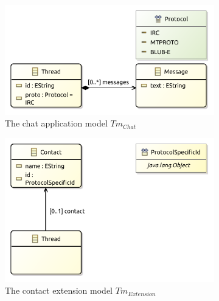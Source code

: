 \begin{figure}
    \centering
    \begin{subfigure}{\textwidth}
        \centering
        \includegraphics{images/04_transformation_framework/type_models_combination/chat_partial2.pdf}
        \caption{The chat application model $Tm_{Chat}$}
        \label{fig:transformation_framework:type_models_and_type_graphs:combining_type_models:combine_example_tmod1}
    \end{subfigure}
    \par\medskip
    \begin{subfigure}{\textwidth}
        \centering
        \includegraphics{images/04_transformation_framework/type_models_combination/chat_partial1.pdf}
        \caption{The contact extension model $Tm_{Extension}$}
        \label{fig:transformation_framework:type_models_and_type_graphs:combining_type_models:combine_example_tmod2}
    \end{subfigure}
    \par\medskip
    \begin{subfigure}{\textwidth}

\end{subfigure}
\end{figure}
